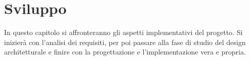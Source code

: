 \chapter{Sviluppo}\label{chap:Sviluppo}
In questo capitolo si affronteranno gli aspetti implementativi del progetto. Si inizierà con l'analisi dei requisiti, per poi passare alla fase di studio del design architetturale e
finire con la progettazione e l'implementazione vera e propria.





